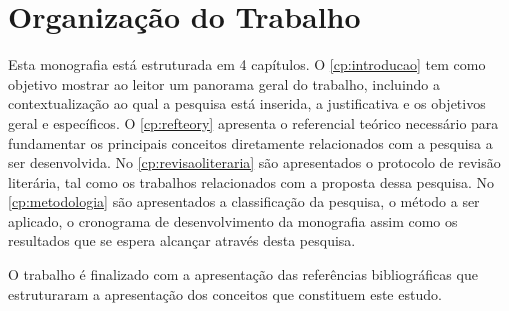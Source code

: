 \section{Organização do Trabalho}\label{cp:intro:organization}
Esta monografia está estruturada em 4 capítulos. O \autoref{cp:introducao} tem como objetivo mostrar ao leitor um panorama geral do trabalho, incluindo a contextualização ao qual a pesquisa está inserida, a justificativa e os objetivos geral e específicos. O \autoref{cp:refteory} apresenta o referencial teórico necessário para fundamentar os principais conceitos diretamente relacionados com a pesquisa a ser desenvolvida. No \autoref{cp:revisaoliteraria} são apresentados o protocolo de revisão literária, tal como os trabalhos relacionados com a proposta dessa pesquisa. No \autoref{cp:metodologia} são apresentados a classificação da pesquisa, o método a ser aplicado, o cronograma de desenvolvimento da monografia assim como os resultados que se espera alcançar através desta pesquisa. 

O trabalho é finalizado com a apresentação das referências bibliográficas que estruturaram a apresentação dos conceitos que constituem este estudo.






